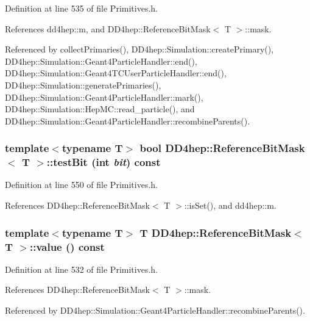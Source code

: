 Definition at line 535 of file Primitives.h.

References dd4hep::m, and DD4hep::ReferenceBitMask$<$ T $>$::mask.

Referenced by collectPrimaries(), DD4hep::Simulation::createPrimary(), DD4hep::Simulation::Geant4ParticleHandler::end(), DD4hep::Simulation::Geant4TCUserParticleHandler::end(), DD4hep::Simulation::generatePrimaries(), DD4hep::Simulation::Geant4ParticleHandler::mark(), DD4hep::Simulation::HepMC::read\_\-particle(), and DD4hep::Simulation::Geant4ParticleHandler::recombineParents().\hypertarget{class_d_d4hep_1_1_reference_bit_mask_a94a8b3a45dc44201a83558f6ac1be0e7}{
\subsubsection[{testBit}]{\setlength{\rightskip}{0pt plus 5cm}template$<$typename T$>$ bool {\bf DD4hep::ReferenceBitMask}$<$ T $>$::testBit (int {\em bit}) const}}
\label{class_d_d4hep_1_1_reference_bit_mask_a94a8b3a45dc44201a83558f6ac1be0e7}


Definition at line 550 of file Primitives.h.

References DD4hep::ReferenceBitMask$<$ T $>$::isSet(), and dd4hep::m.\hypertarget{class_d_d4hep_1_1_reference_bit_mask_a3b71064829b722af036cdf74ca0d1c75}{
\subsubsection[{value}]{\setlength{\rightskip}{0pt plus 5cm}template$<$typename T$>$ T {\bf DD4hep::ReferenceBitMask}$<$ T $>$::value () const}}
\label{class_d_d4hep_1_1_reference_bit_mask_a3b71064829b722af036cdf74ca0d1c75}


Definition at line 532 of file Primitives.h.

References DD4hep::ReferenceBitMask$<$ T $>$::mask.

Referenced by DD4hep::Simulation::Geant4ParticleHandler::recombineParents().


